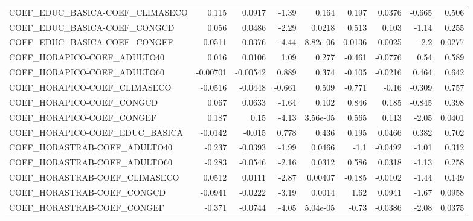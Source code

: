\begin{tabular}{lrrrrrrrr}
COEF\_EDUC\_BASICA-COEF\_CLIMASECO       &       0.115 &       0.0917 &   -1.39 &    0.164 &      0.197 &      0.0376 &       -0.665 &         0.506 \\
COEF\_EDUC\_BASICA-COEF\_CONGCD          &       0.056 &       0.0486 &   -2.29 &   0.0218 &      0.513 &       0.103 &        -1.14 &         0.255 \\
COEF\_EDUC\_BASICA-COEF\_CONGEF          &      0.0511 &       0.0376 &   -4.44 & 8.82e-06 &     0.0136 &      0.0025 &         -2.2 &        0.0277 \\
COEF\_HORAPICO-COEF\_ADULTO40           &       0.016 &       0.0106 &    1.09 &    0.277 &     -0.461 &     -0.0776 &         0.54 &         0.589 \\
COEF\_HORAPICO-COEF\_ADULTO60           &    -0.00701 &     -0.00542 &   0.889 &    0.374 &     -0.105 &     -0.0216 &        0.464 &         0.642 \\
COEF\_HORAPICO-COEF\_CLIMASECO          &     -0.0516 &      -0.0448 &  -0.661 &    0.509 &     -0.771 &       -0.16 &       -0.309 &         0.757 \\
COEF\_HORAPICO-COEF\_CONGCD             &       0.067 &       0.0633 &   -1.64 &    0.102 &      0.846 &       0.185 &       -0.845 &         0.398 \\
COEF\_HORAPICO-COEF\_CONGEF             &       0.187 &         0.15 &   -4.13 & 3.56e-05 &      0.565 &       0.113 &        -2.05 &        0.0401 \\
COEF\_HORAPICO-COEF\_EDUC\_BASICA        &     -0.0142 &       -0.015 &   0.778 &    0.436 &      0.195 &      0.0466 &        0.382 &         0.702 \\
COEF\_HORASTRAB-COEF\_ADULTO40          &      -0.237 &      -0.0393 &   -1.99 &   0.0466 &       -1.1 &     -0.0492 &        -1.01 &         0.312 \\
COEF\_HORASTRAB-COEF\_ADULTO60          &      -0.283 &      -0.0546 &   -2.16 &   0.0312 &      0.586 &      0.0318 &        -1.13 &         0.258 \\
COEF\_HORASTRAB-COEF\_CLIMASECO         &      0.0512 &       0.0111 &   -2.87 &  0.00407 &     -0.185 &     -0.0102 &        -1.44 &         0.149 \\
COEF\_HORASTRAB-COEF\_CONGCD            &     -0.0941 &      -0.0222 &   -3.19 &   0.0014 &       1.62 &      0.0941 &        -1.67 &        0.0958 \\
COEF\_HORASTRAB-COEF\_CONGEF            &      -0.371 &      -0.0744 &   -4.05 & 5.04e-05 &      -0.73 &     -0.0386 &        -2.08 &        0.0375 \\

\end{tabular}

